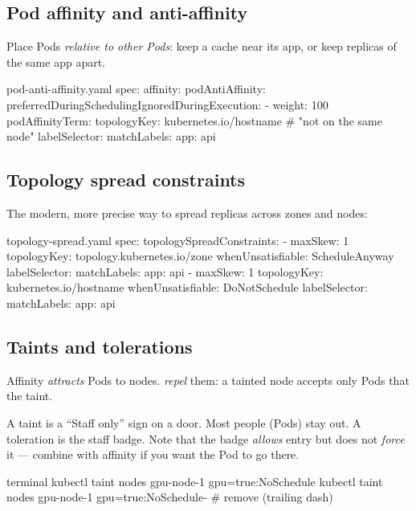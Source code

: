 \subsection{Pod affinity and anti-affinity}

Place Pods \emph{relative to other Pods}: keep a cache near its app, or keep
replicas of the same app apart.

\begin{yamlcode}{pod-anti-affinity.yaml}
spec:
  affinity:
    podAntiAffinity:
      preferredDuringSchedulingIgnoredDuringExecution:
        - weight: 100
          podAffinityTerm:
            topologyKey: kubernetes.io/hostname    # "not on the same node"
            labelSelector:
              matchLabels: { app: api }
\end{yamlcode}

\subsection{Topology spread constraints}

The modern, more precise way to spread replicas across zones and nodes:

\begin{yamlcode}{topology-spread.yaml}
spec:
  topologySpreadConstraints:
    - maxSkew: 1
      topologyKey: topology.kubernetes.io/zone
      whenUnsatisfiable: ScheduleAnyway
      labelSelector:
        matchLabels: { app: api }
    - maxSkew: 1
      topologyKey: kubernetes.io/hostname
      whenUnsatisfiable: DoNotSchedule
      labelSelector:
        matchLabels: { app: api }
\end{yamlcode}

\subsection{Taints and tolerations}

Affinity \emph{attracts} Pods to nodes.  \emph{repel} them: a
tainted node accepts only Pods that  the taint.

\begin{analogy}
A taint is a ``Staff only'' sign on a door. Most people (Pods) stay out. A
toleration is the staff badge. Note that the badge \emph{allows} entry but does
not \emph{force} it --- combine with affinity if you want the Pod to go there.
\end{analogy}

\begin{bashcode}{terminal}
kubectl taint nodes gpu-node-1 gpu=true:NoSchedule
kubectl taint nodes gpu-node-1 gpu=true:NoSchedule-     # remove (trailing dash)
\end{bashcode}

